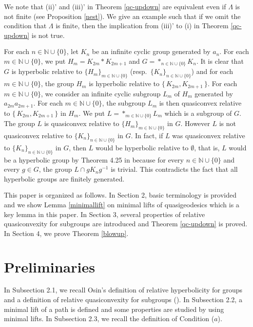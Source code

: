 \documentclass{amsart}
\theoremstyle{definition}
\begin{document}
We note that (ii)' and (iii)' in Theorem \ref{qc-updown} are equivalent even if $\Lambda$ is not finite (see Proposition \ref{nest}). 
We give an example such that if we omit the condition that $\Lambda$ is finite, then the implication from (iii)' to (i) in Theorem \ref{qc-updown} is not true. 

For each $n \in {\mathbb{N}} \cup \{0\}$, let $K_n$ be an infinite cyclic group generated by $a_n$. 
For each $m \in {\mathbb{N}} \cup \{0\}$, we put $H_m=K_{2m}\ast K_{2m+1}$ and $G=\ast_{n\in {\mathbb{N}} \cup \{0\}}K_n$. 
It is clear that $G$ is hyperbolic relative to $\{H_m\}_{m\in{\mathbb{N}} \cup \{0\}}$ (resp.\ $\{K_n\}_{n\in{\mathbb{N}} \cup \{0\}}$) and for each $m\in{\mathbb{N}} \cup \{0\}$, the group $H_m$ is hyperbolic relative to $\{\, K_{2m},K_{2m+1}\,\}$. 
For each $m\in {\mathbb{N}} \cup \{0\}$, we consider an infinite cyclic subgroup $L_m$ of $H_m$ generated by $a_{2m}a_{2m+1}$. 
For each $m\in {\mathbb{N}} \cup \{0\}$, the subgroup $L_m$ is then quasiconvex relative to $\{\, K_{2m},K_{2m+1}\,\}$ in $H_m$. 
We put $L=\ast_{m\in {\mathbb{N}} \cup \{0\}}L_m$ which is a subgroup of $G$. 
The group $L$ is quasiconvex relative to $\{H_m\}_{m\in{\mathbb{N}} \cup \{0\}}$ in $G$. 
However $L$ is not quasiconvex relative to $\{K_n\}_{n\in{\mathbb{N}} \cup \{0\}}$ in $G$. 
In fact, if $L$ was quasiconvex relative to $\{K_n\}_{n\in{\mathbb{N}} \cup \{0\}}$ in $G$, then $L$ would be hyperbolic relative to $\emptyset$, that is, $L$ would be a hyperbolic group by Theorem 4.25 in \cite{M-O-Y1} because  for every $n\in {\mathbb{N}} \cup \{0\}$ and every $g\in G$, the group $L\cap gK_ng^{-1}$ is trivial. 
This contradicts the fact that all hyperbolic groups are finitely generated. 

\medskip
This paper is organized as follows. 
In Section 2, basic terminology is provided and we show Lemma \ref{minimallift} on minimal lifts of quasigeodesics which is a key lemma in this paper. 
In Section 3, several properties of relative quasiconvexity for subgroups are introduced and Theorem \ref{qc-updown} is proved. 
In Section 4, we prove Theorem \ref{blowup}. 

\section{Preliminaries}
In Subsection 2.1, we recall Osin's definition of relative hyperbolicity for groups and a definition of relative quasiconvexity for subgroups (\cite[Definition 1.2]{M-O-Y1}). 
In Subsection 2.2, a minimal lift of a path is defined and some properties are studied by using minimal lifts. 
In Subsection 2.3, we recall the definition of Condition ($a$). 
\end{document}

